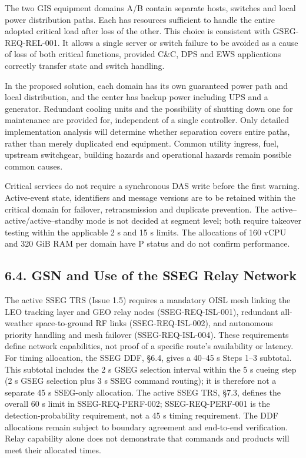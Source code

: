 The two GIS equipment domains A/\allowbreak{}B contain separate hosts, switches and local power distribution paths. Each has resources sufficient to handle the entire adopted critical load after loss of the other. This choice is consistent with GSEG-REQ-REL-001. It allows a single server or switch failure to be avoided as a cause of loss of both critical functions, provided C\&C, DPS and EWS applications correctly transfer state and switch handling.

In the proposed solution, each domain has its own guaranteed power path and local distribution, and the center has backup power including UPS and a generator. Redundant cooling units and the possibility of shutting down one for maintenance are provided for, independent of a single controller. Only detailed implementation analysis will determine whether separation covers entire paths, rather than merely duplicated end equipment. Common utility ingress, fuel, upstream switchgear, building hazards and operational hazards remain possible common causes.

Critical services do not require a synchronous DAS write before the first warning. Active-event state, identifiers and message versions are to be retained within the critical domain for failover, retransmission and duplicate prevention. The active–active/\allowbreak{}active–standby mode is not decided at segment level; both require takeover testing within the applicable 2 s and 15 s limits. The allocations of 160 vCPU and 320 GiB RAM per domain have P status and do not confirm performance.

\subsection{6.4. GSN and Use of the SSEG Relay Network}\label{ddjf-6-4}

The active SSEG TRS (Issue 1.5) requires a mandatory OISL mesh linking the LEO tracking layer and GEO relay nodes (SSEG-REQ-ISL-001), redundant all-weather space-to-ground RF links (SSEG-REQ-ISL-002), and autonomous priority handling and mesh failover (SSEG-REQ-ISL-004). These requirements define network capabilities, not proof of a specific route's availability or latency. For timing allocation, the SSEG DDF, §6.4, gives a 40--45 s Steps 1--3 subtotal. This subtotal includes the 2 s GSEG selection interval within the 5 s cueing step (2 s GSEG selection plus 3 s SSEG command routing); it is therefore not a separate 45 s SSEG-only allocation. The active SSEG TRS, §7.3, defines the overall 60 s limit in SSEG-REQ-PERF-002; SSEG-REQ-PERF-001 is the detection-probability requirement, not a 45 s timing requirement. The DDF allocations remain subject to boundary agreement and end-to-end verification. Relay capability alone does not demonstrate that commands and products will meet their allocated times.

